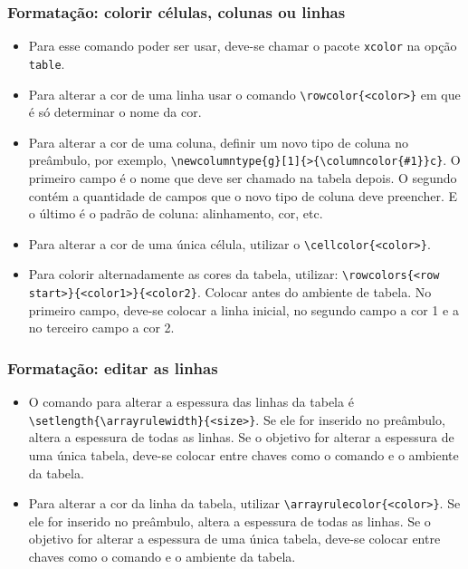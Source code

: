 \documentclass[brazilian]{beamer}
\begin{document}
\begin{frame}
  \frametitle{Formatação: colorir células, colunas ou linhas}

  \begin{itemize}
    \item Para esse comando poder ser usar, deve-se chamar o pacote \texttt{xcolor} na opção \texttt{table}.
    \item Para alterar a cor de uma linha usar o comando \lstinline[style=myStyleLatex]!\rowcolor{<color>}! em que é só determinar o nome da cor.
    \item Para alterar a cor de uma coluna, definir um novo tipo de coluna no preâmbulo, por exemplo, \lstinline[style=myStyleLatex]!\newcolumntype{g}[1]{>{\columncolor{#1}}c}!. O primeiro campo é o nome que deve ser chamado na tabela depois. O segundo contém a quantidade de campos que o novo tipo de coluna deve preencher. E o último é o padrão de coluna: alinhamento, cor, etc.
    \item Para alterar a cor de uma única célula, utilizar o \lstinline[style=myStyleLatex]!\cellcolor{<color>}!.
    \item Para colorir alternadamente as cores da tabela, utilizar: \lstinline[style=myStyleLatex]!\rowcolors{<row start>}{<color1>}{<color2}!. Colocar antes do ambiente de tabela. No primeiro campo, deve-se colocar a linha inicial, no segundo campo a cor 1 e a no terceiro campo a cor 2.
  \end{itemize}

\end{frame}
\begin{frame}[fragile]
  \frametitle{Formatação: editar as linhas}

  \begin{itemize}
    \item O comando para alterar a espessura das linhas da tabela é \lstinline[style=myStyleLatex]!\setlength{\arrayrulewidth}{<size>}!. Se ele for inserido no preâmbulo, altera a espessura de todas as linhas. Se o objetivo for alterar a espessura de uma única tabela, deve-se colocar entre chaves como o comando e o ambiente da tabela.
    \item Para alterar a cor da linha da tabela, utilizar \lstinline[style=myStyleLatex]!\arrayrulecolor{<color>}!. Se ele for inserido no preâmbulo, altera a espessura de todas as linhas. Se o objetivo for alterar a espessura de uma única tabela, deve-se colocar entre chaves como o comando e o ambiente da tabela.
  \end{itemize}

\end{frame}
\end{document}
